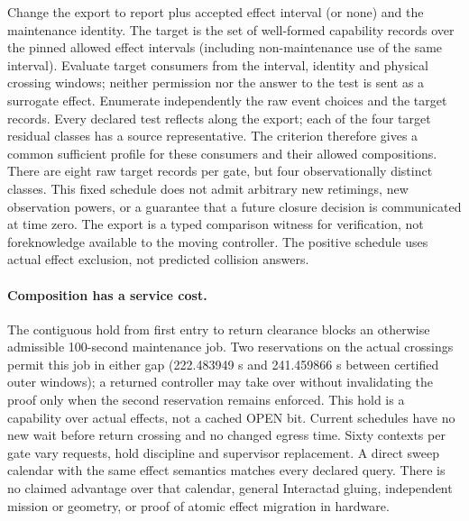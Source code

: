 \documentclass{article}
\begin{document}
Change the export to report plus accepted effect interval (or none)
and the maintenance identity. The target is the set of well-formed
capability records over the pinned allowed effect intervals
(including non-maintenance use of the same interval). Evaluate target
consumers from the interval, identity and physical crossing
windows; neither permission nor the answer to the test is sent as a
surrogate effect. Enumerate independently the raw event choices and
the target records. Every declared test reflects along the export;
each of the four target residual classes has a source representative.
The criterion therefore gives a common sufficient profile for these
consumers and their allowed compositions. There are eight raw
target records per gate, but four observationally distinct classes.
This fixed schedule does not admit arbitrary new retimings,
new observation powers, or a guarantee that a future closure
decision is communicated at time zero. The export is a typed
comparison witness for verification, not foreknowledge available to
the moving controller. The positive schedule uses actual effect
exclusion, not predicted collision answers.

\paragraph{Composition has a service cost.}
The contiguous hold from first entry to return clearance blocks an
otherwise admissible 100-second maintenance job. Two reservations on
the actual crossings permit this job in either gap (222.483949 s
and 241.459866 s between certified outer windows); a returned controller
may take over without invalidating the proof only when the second
reservation remains enforced. This hold is a capability over actual
effects, not a cached OPEN bit. Current schedules have no new wait
before return crossing and no changed egress time. Sixty contexts
per gate vary requests, hold discipline and supervisor replacement.
A direct sweep calendar with the same effect semantics matches every
declared query. There is no claimed advantage over that calendar,
general Interactad gluing, independent mission or geometry, or proof
of atomic effect migration in hardware.
\end{document}

